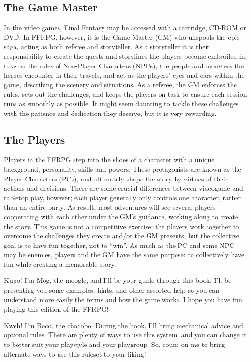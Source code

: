 \begin{multicols}{2}
\subsection{The Game Master}\label{subsec:gm}
In the video games, Final Fantasy may be accessed with a cartridge, CD-ROM or DVD\@{}. In FFRPG, however, it is the Game Master (GM) who unspools the epic saga, acting as both referee and storyteller. As a storyteller it is their responsibility to create the quests and storylines the players become embroiled in, take on the roles of Non-Player Characters (NPCs), the people and monsters the heroes encounter in their travels, and act as the players' eyes and ears within the game, describing the scenery and situations. As a referee, the GM enforces the rules, sets out the challenges, and keeps the players on task to ensure each session runs as smoothly as possible. It might seem daunting to tackle these challenges with the patience and dedication they deserve, but it is very rewarding.
\subsection{The Players}\label{subsec:players}
Players in the FFRPG step into the shoes of a character with a unique background, personality, skills and powers. These protagonists are known as the Player Characters (PCs), and ultimately shape the story by virtues of their actions and decisions. There are some crucial differences between videogame and tabletop play, however; each player generally only controls one character, rather than an entire party. As result, most adventures will see several players cooperating with each other under the GM's guidance, working along to create the story. This game is not a competitive exercise: the players work together to overcome the challenges they create and/or the GM presents, but the collective goal is to have fun together, not to “win”. As much as the PC and some NPC may be enemies, players and the GM have the same purpose: to collectively have fun while creating a memorable story.
\begin{mog}
Kupo! I'm Mog, the moogle, and I'll be your guide through this book. I'll be presenting you some examples, hints, and other assorted help so you can understand more easily the terms and how the game works. I hope you have fun playing this edition of the FFRPG\@{}!
\end{mog}
\begin{boco}
Kweh! I'm Boco, the chocobo. During the book, I'll bring mechanical advice and optional rules. There are plenty of ways to use this system, and you can change it to better suit your playstyle and your playgroup. So, count on me to bring alternate ways to use this ruleset to your liking!
\end{boco}
\end{multicols}

